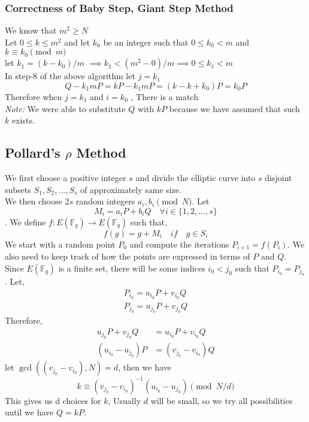 \subsubsection{Correctness of Baby Step, Giant Step Method}
We know that $m^2 \geq N$ \\
Let $0 \leq k \leq m^2$ and let $k_0$ be an integer such that $0 \leq k_0 < m$ and $k \equiv k_0 \pmod m$ \\
let $k_1 = (k-k_0)/m$ $\implies k_1 < (m^2 - 0)/m \implies 0 \leq k_1 < m$ \\
In step-8 of the above algorithm let $j = k_1$
\[ Q - k_1mP = kP - k_1mP = (k - k + k_0)P = k_0P \]
Therefore when $j = k_1$ and $i = k_0$ , There is a match\\
\textit{Note:} We were able to substitute $Q$ with $kP$ because we have assumed that such $k$ exists.


\subsection{Pollard's $\rho$ Method}
We first choose a positive integer $s$ and divide the elliptic curve into $s$ disjoint subsets $S_1, S_2, ..., S_s$ of approximately same size.\\
We then choose $2s$ random integers $a_i, b_i \pmod N$. Let
\[M_i = a_iP + b_iQ \quad \forall i \in \{1,2,...,s\}\].
We define $f:E(\mathbb{F}_q) \rightarrow E(\mathbb{F}_q)$ such that,
\[f(g) = g + M_i \quad if \quad g \in S_i\]
We start with a random point $P_0$ and compute the iterations $P_{i+1} = f(P_i)$. We also need to keep track of how the points are expressed in terms of $P$ and $Q$. Since $E(\mathbb{F}_q)$ is a finite set, there will be some indices $i_0 < j_0$ such that $P_{i_0} = P_{j_0}$. Let,
\begin{align*}
    P_{i_0} = u_{i_0}P + v_{i_0}Q\\
    P_{j_0} = u_{j_0}P + v_{j_0}Q
\end{align*}
Therefore,
\begin{align*}
    u_{j_0}P + v_{j_0}Q &= u_{i_0}P + v_{i_0}Q \\
    ( u_{i_0} - u_{j_0})P &= (v_{j_0} - v_{i_0})Q  
\end{align*}
let $\gcd((v_{j_0} - v_{i_0}), N) = d$, then we have
\[k \equiv (v_{j_0} - v_{i_0})^{-1}( u_{i_0} - u_{j_0}) \pmod{N/d} \]
This gives us d choices for $k$, Usually $d$ will be small, so we try all possibilities until we have $Q = kP$. \pagebreak


